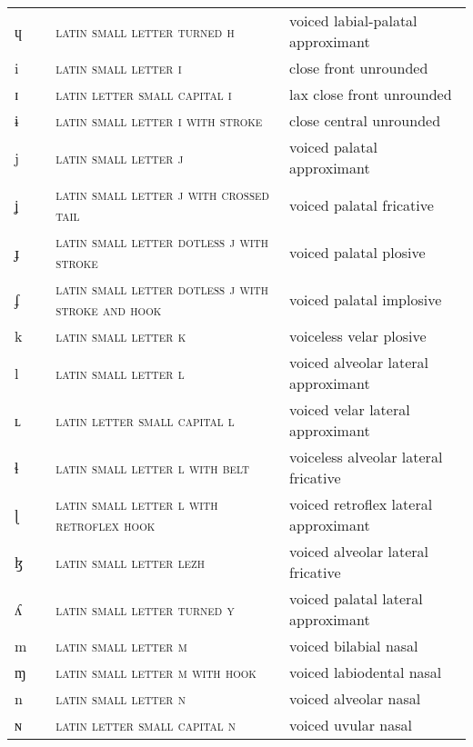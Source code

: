 \begin{center}
\begin{xtabular}{ l L{1.2cm} L{5.4cm} L{4.2cm} }
ɥ &  & \textsc{latin small letter turned h} & voiced labial-palatal approximant \\ 
i &  & \textsc{latin small letter i} & close front unrounded \\ 
ɪ &  & \textsc{latin letter small capital i} & lax close front unrounded \\ 
ɨ &  & \textsc{latin small letter i with stroke} & close central unrounded \\ 
j &  & \textsc{latin small letter j} & voiced palatal approximant \\ 
ʝ &  & \textsc{latin small letter j with crossed tail} & voiced palatal fricative \\ 
ɟ &  & \textsc{latin small letter dotless j with stroke} & voiced palatal plosive \\ 
ʄ &  & \textsc{latin small letter dotless j with stroke and hook} & voiced palatal implosive \\ 
k &  & \textsc{latin small letter k} & voiceless velar plosive \\ 
l &  & \textsc{latin small letter l} & voiced alveolar lateral approximant \\ 
ʟ &  & \textsc{latin letter small capital l} & voiced velar lateral approximant \\ 
ɬ &  & \textsc{latin small letter l with belt} & voiceless alveolar lateral fricative \\ 
ɭ &  & \textsc{latin small letter l with retroflex hook} & voiced retroflex lateral approximant \\ 
ɮ &  & \textsc{latin small letter lezh} & voiced alveolar lateral fricative \\ 
ʎ &  & \textsc{latin small letter turned y} & voiced palatal lateral approximant \\ 
m &  & \textsc{latin small letter m} & voiced bilabial nasal \\ 
ɱ &  & \textsc{latin small letter m with hook} & voiced labiodental nasal \\ 
n &  & \textsc{latin small letter n} & voiced alveolar nasal \\ 
ɴ &  & \textsc{latin letter small capital n} & voiced uvular nasal \\ 

\end{xtabular}
\end{center}
